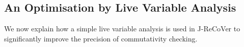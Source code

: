 \documentclass{llncs}
\newcommand{\rloop}{
	\ifmmode
	\mathbf{Loop}
	\else
	\textbf{Loop}
	\fi}
\begin{document}
% 
% 


\subsection{An Optimisation by Live Variable Analysis}
\label{section:optimizations}

We now explain how a simple live variable analysis is used in J-ReCoVer to
significantly improve the precision of commutativity checking.
\end{document}
